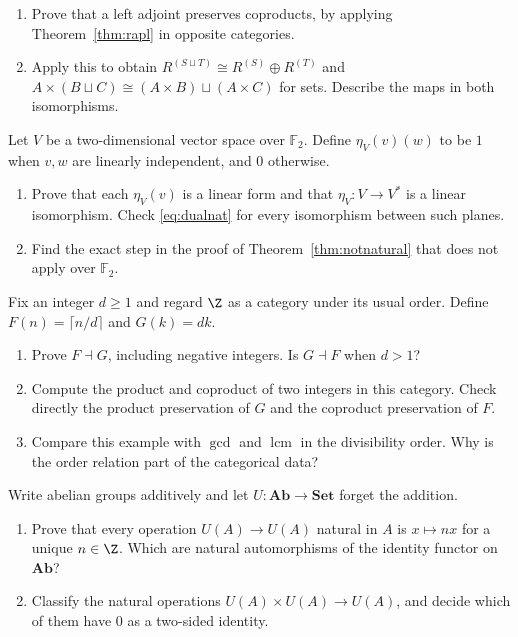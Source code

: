 \begin{exercise}[$\star\star$]\label{ex:leftadj}
\begin{enumerate}[label=(\alph*)]
\item Prove that a left adjoint preserves coproducts, by applying Theorem~\ref{thm:rapl} in opposite categories.
\item Apply this to obtain $R^{(S\sqcup T)}\cong R^{(S)}\oplus R^{(T)}$ and $A\times(B\sqcup C)\cong(A\times B)\sqcup(A\times C)$ for sets. Describe the maps in both isomorphisms.
\end{enumerate}
\end{exercise}

\begin{exercise}[$\star\star$]\label{ex:f2plane}
Let $V$ be a two-dimensional vector space over $\mathbb F_2$. Define $\eta_V(v)(w)$ to be $1$ when $v,w$ are linearly independent, and $0$ otherwise.
\begin{enumerate}[label=(\alph*)]
\item Prove that each $\eta_V(v)$ is a linear form and that $\eta_V:V\to V^*$ is a linear isomorphism. Check \eqref{eq:dualnat} for every isomorphism between such planes.
\item Find the exact step in the proof of Theorem~\ref{thm:notnatural} that does not apply over $\mathbb F_2$.
\end{enumerate}
\end{exercise}

\begin{exercise}[$\star\star$]\label{ex:v10new-ch01-adjunction-order}
Fix an integer $d\ge1$ and regard $\Z$ as a category under its usual order. Define $F(n)=\lceil n/d\rceil$ and $G(k)=dk$.
\begin{enumerate}[label=(\alph*)]
\item Prove $F\dashv G$, including negative integers. Is $G\dashv F$ when $d>1$?
\item Compute the product and coproduct of two integers in this category. Check directly the product preservation of $G$ and the coproduct preservation of $F$.
\item Compare this example with $\gcd$ and $\operatorname{lcm}$ in the divisibility order. Why is the order relation part of the categorical data?
\end{enumerate}
\end{exercise}

\begin{exercise}[$\star\star$]\label{ex:v10new-ch01-abelian-operations}
Write abelian groups additively and let $U:\mathbf{Ab}\to\mathbf{Set}$ forget the addition.
\begin{enumerate}[label=(\alph*)]
\item Prove that every operation $U(A)\to U(A)$ natural in $A$ is $x\mapsto nx$ for a unique $n\in\Z$. Which are natural automorphisms of the identity functor on $\mathbf{Ab}$?
\item Classify the natural operations $U(A)\times U(A)\to U(A)$, and decide which of them have $0$ as a two-sided identity.
\end{enumerate}
\end{exercise}

